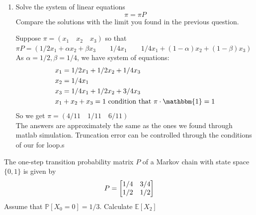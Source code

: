 \documentclass[12pt,twoside, letter]{exam}
\theoremstyle{definition}
\newcommand{\ee}{\mathbb{E}}
\newcommand{\pp}{\mathbb{P}}
\newcommand{\id}{\mathbbm{1}}
\begin{document}
\begin{enumerate}
    \item Solve the system of linear equations
      \begin{equation*}
        \pi = \pi P
      \end{equation*}
      Compare the solutions with the limit you found in the previous question.
      \begin{solution}
        Suppose $\pi = (x_1 \quad x_2 \quad x_3)$ so that \\
        $\pi P = (1/2x_1 + \alpha x_2 + \beta x_3 \qquad 1/4x_1 \qquad 1/4x_1 + (1-\alpha)x_2 + (1-\beta)x_3)$ \\
        As $\alpha = 1/2, \beta = 1/4$, we have system of equations:
          \begin{align*}
            &x_1 = 1/2x_1 + 1/2 x_2 + 1/4 x_3 \\
            &x_2 = 1/4x_1 \\
            &x_3 = 1/4x_1 + 1/2 x_2 + 3/4x_3 \\
            &x_1 + x_2 + x_3 = 1 \text{ condition that $\pi \cdot \id = 1$}
          \end{align*}
        So we get $\pi = (4/11 \quad 1/11 \quad 6/11)$ \\
The answers are approximately the same as the ones we found through matlab simulation. Truncation error can be controlled through the conditions of our for loop.s
      \end{solution}
  \end{enumerate}

\par{The one-step transition probability matrix $P$ of a Markov chain with state space $\{0,1\}$ is given by}
\begin{align*}
  \centering
  P =
    \begin{bmatrix}
      1/4 & 3/4 \\
      1/2 & 1/2 \\
    \end{bmatrix}
\end{align*}
Assume that $\pp[X_0 = 0] = 1/3$. Calculate $\ee[X_2]$
\end{document}
